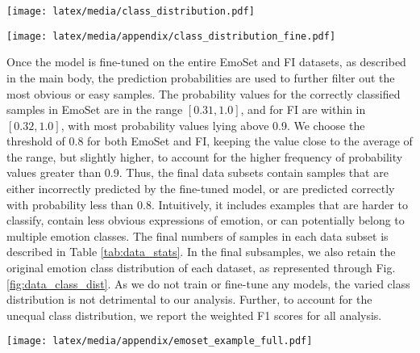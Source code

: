 \begin{figure*}
    \centerline{
    \texttt{[image: latex/media/class\_distribution.pdf]}
    }
    \caption{The distribution of different emotion classes in the final evaluation sets considered. The numbers of samples in different emotion classes, in EmoSet-Hard and FI-Hard are proportional to the original class distribution in the candidate sets they are obtained from by subsampling.}
    \label{fig:data_class_dist}
\end{figure*}

\begin{figure*}
    \centerline{
    \texttt{[image: latex/media/appendix/class\_distribution\_fine.pdf]}
    }
    \caption{The distribution of different emotion classes in the final evaluation sets considered, grouped according to the broader Sentiment and Arousal categories. The grouping is shown only for the datasets considered in fine-grained class-specific analysis.}
\end{figure*}

Once the model is fine-tuned on the entire EmoSet and FI datasets, as described in the main body, the prediction probabilities are used to further filter out the most obvious or easy samples. The probability values for the correctly classified samples in EmoSet are in the range \([0.31, 1.0]\), and for FI are within in \([0.32, 1.0]\), with most probability values lying above 0.9. We choose the threshold of 0.8 for both EmoSet and FI, keeping the value close to the average of the range, but slightly higher, to account for the higher frequency of probability values greater than 0.9. Thus, the final data subsets contain samples that are either incorrectly predicted by the fine-tuned model, or are predicted correctly with probability less than 0.8. Intuitively, it includes examples that are harder to classify, contain less obvious expressions of emotion, or can potentially belong to multiple emotion classes. The final numbers of samples in each data subset is described in Table \ref{tab:data_stats}. In the final subsamples, we also retain the original emotion class distribution of each dataset, as represented through Fig. \ref{fig:data_class_dist}. As we do not train or fine-tune any models, the varied class distribution is not detrimental to our analysis. Further, to account for the unequal class distribution, we report the weighted F1 scores for all analysis.

\begin{figure*}
    \centerline{
    \texttt{[image: latex/media/appendix/emoset\_example\_full.pdf]}}
    \caption{Examples from the created \textbf{EmoSet-Hard} dataset. For Contentment and Excitement, no instances are found that are predicted correctly with a probability less than 0.8. For all other categories, the two leftmost examples describe instances that are correctly predicted, but with a probability less than 0.8. The next example shows an image predicted incorrectly. Finally, the rightmost example for all categories show the correctly predicted samples, which have probability of prediction higher than 0.8.}
    \label{fig:benchmark_example_emoset}
\end{figure*}

